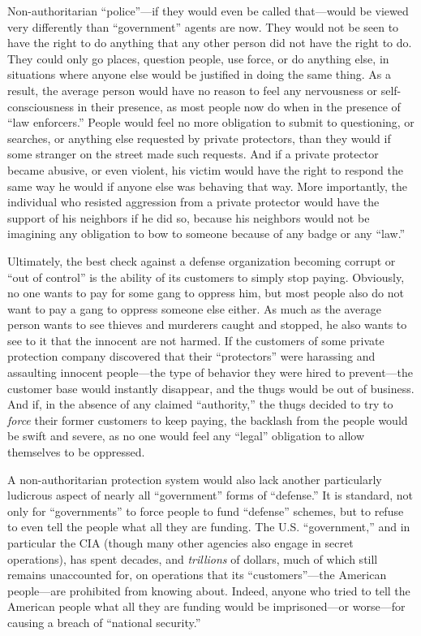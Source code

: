 \documentclass{book}
\begin{document}
Non-authoritarian \enquote{police}---if they would even be called that---would be viewed very differently than \enquote{government} agents are now. They would not be seen to have the right to do anything that any other person did not have the right to do. They could only go places, question people, use force, or do anything else, in situations where anyone else would be justified in doing the same thing. As a result, the average person would have no reason to feel any nervousness or self-consciousness in their presence, as most people now do when in the presence of \enquote{law enforcers.} People would feel no more obligation to submit to questioning, or searches, or anything else requested by private protectors, than they would if some stranger on the street made such requests. And if a private protector became abusive, or even violent, his victim would have the right to respond the same way he would if anyone else was behaving that way. More importantly, the individual who resisted aggression from a private protector would have the support of his neighbors if he did so, because his neighbors would not be imagining any obligation to bow to someone because of any badge or any \enquote{law.}

Ultimately, the best check against a defense organization becoming corrupt or \enquote{out of control} is the ability of its customers to simply stop paying. Obviously, no one wants to pay for some gang to oppress him, but most people also do not want to pay a gang to oppress someone else either. As much as the average person wants to see thieves and murderers caught and stopped, he also wants to see to it that the innocent are not harmed. If the customers of some private protection company discovered that their \enquote{protectors} were harassing and assaulting innocent people---the type of behavior they were hired to prevent---the customer base would instantly disappear, and the thugs would be out of business. And if, in the absence of any claimed \enquote{authority,} the thugs decided to try to \emph{force} their former customers to keep paying, the backlash from the people would be swift and severe, as no one would feel any \enquote{legal} obligation to allow themselves to be oppressed.

A non-authoritarian protection system would also lack another particularly ludicrous aspect of nearly all \enquote{government} forms of \enquote{defense.} It is standard, not only for \enquote{governments} to force people to fund \enquote{defense} schemes, but to refuse to even tell the people what all they are funding. The U.S. \enquote{government,} and in particular the CIA (though many other agencies also engage in secret operations), has spent decades, and \emph{trillions} of dollars, much of which still remains unaccounted for, on operations that its \enquote{customers}---the American people---are prohibited from knowing about. Indeed, anyone who tried to tell the American people what all they are funding would be imprisoned---or worse---for causing a breach of \enquote{national security.}
\end{document}
